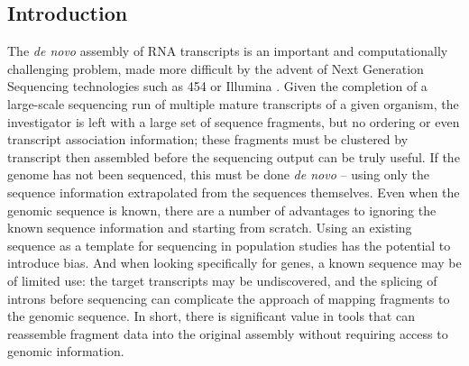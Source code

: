 \documentclass[10pt]{bmc_article}
\newenvironment{bmcformat}{\begin{raggedright}\baselineskip20pt\sloppy\setboolean{publ}{false}}{\end{raggedright}\baselineskip20pt\sloppy}
\begin{document}
\begin{bmcformat}
\begin{abstract}
\end{abstract}











\section*{Introduction}
The {\it de novo} assembly of RNA transcripts is an important and
computationally challenging problem, made more difficult by the advent
of Next Generation Sequencing technologies such as 454 or Illumina
\cite{Nagaraj07,Rao10}.  Given the completion of a large-scale sequencing run of
multiple mature transcripts of a given organism, the investigator is
left with a large set of sequence fragments, but no ordering or even
transcript association information; these fragments must be clustered
by transcript then assembled before the sequencing output can be truly
useful.  If the genome has not been sequenced, this must be done {\it
  de novo} -- using only the sequence information extrapolated from
the sequences themselves.  Even when the genomic sequence is known,
there are a number of advantages to ignoring the known sequence
information and starting from scratch.  Using an existing sequence as
a template for sequencing in population studies has the potential to
introduce bias.  And when looking specifically for genes, a known
sequence may be of limited use: the target transcripts may be
undiscovered, and the splicing of introns before sequencing can
complicate the approach of mapping fragments to the genomic sequence.
In short, there is significant value in tools that can reassemble
fragment data into the original assembly without requiring access to
genomic information.


\end{bmcformat}
\end{document}

